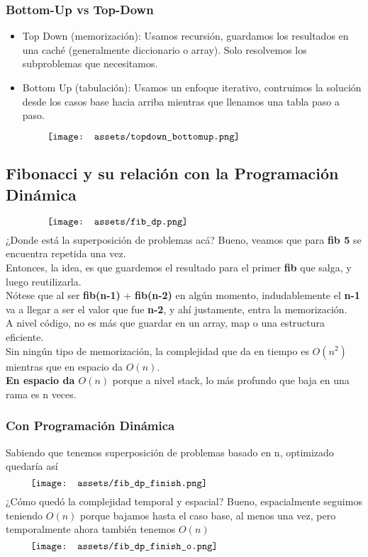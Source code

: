 \documentclass[10pt,a4paper]{article}
\begin{document}
\subsubsection*{Bottom-Up vs Top-Down}
\begin{itemize}
    \item Top Down (memorización): Usamos recursión, guardamos los resultados en una caché (generalmente diccionario o array). Solo resolvemos los subproblemas que necesitamos.
    \item Bottom Up (tabulación): Usamos un enfoque iterativo, contruimos la solución desde los casos base hacia arriba mientras que llenamos una tabla paso a paso. 
\end{itemize}
\[\begin{minipage}[b]{0.8\textwidth}
    \texttt{[image: assets/topdown\_bottomup.png]}
\end{minipage}\]
\subsection*{Fibonacci y su relación con la Programación Dinámica}
\[\begin{minipage}[b]{0.8\textwidth}
    \texttt{[image: assets/fib\_dp.png]}
\end{minipage}\]
¿Donde está la superposición de problemas acá? Bueno, veamos que para \textbf{fib 5} se encuentra repetida una vez. \\
Entonces, la idea, es que guardemos el resultado para el primer \textbf{fib} que salga, y luego reutilizarla. \\
Nótese que al ser \textbf{fib(n-1)} + \textbf{fib(n-2)} en algún momento, indudablemente el \textbf{n-1} va a llegar a ser el valor que fue \textbf{n-2}, y ahí justamente, entra la memorización. \\
A nivel código, no es más que guardar en un array, map o una estructura eficiente. \\ 
Sin ningún tipo de memorización, la complejidad que da en tiempo es $O(n^{2})$ mientras que en espacio da $O(n)$. \\
\textbf{En espacio da $O(n)$} porque a nivel stack, lo más profundo que baja en una rama es n veces. 
\subsubsection*{Con Programación Dinámica}
Sabiendo que tenemos superposición de problemas basado en n, optimizado quedaría así
\[\begin{minipage}[b]{0.9\textwidth}
    \texttt{[image: assets/fib\_dp\_finish.png]}
\end{minipage}\]
¿Cómo quedó la complejidad temporal y espacial? Bueno, espacialmente seguimos teniendo $O(n)$ porque bajamos hasta el caso base, al menos una vez, pero temporalmente ahora también tenemos $O(n)$
\[\begin{minipage}[b]{0.9\textwidth}
    \texttt{[image: assets/fib\_dp\_finish\_o.png]}
\end{minipage}\]
\end{document}
